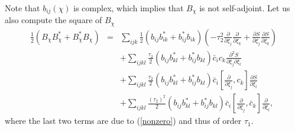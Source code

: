 \documentclass[12pt]{article}
\newcommand{\nn}{\nonumber}
\newcommand{\pa}{\partial}
\begin{document}
Note that $b_{ij}(\chi)$ is complex, which implies that $B_\chi$ is not self-adjoint.
Let us also  compute the square of $B_\chi$  
\begin{eqnarray}
\frac{1}{2}\left( B_\chi B_\chi^*+ B_\chi^* B_\chi \right)&=&  \sum_{ijk}  \frac{1}{2}\left(  b_{ij}  b^*_{ik} +  b^*_{ij}  b_{ik}  \right)  \left(  -\tau_2^2     \frac{\pa}{\pa\xi_{j }}  \frac{\pa}{\pa\xi_{k }}    
+  \frac{\pa S}{\pa \xi_j}\frac{\pa S}{\pa \xi_k}  \right)
\nn\\&&
+ \sum_{ijkl} \frac{\tau_2}{2} \left(  b_{ij} b_{kl}^*+ b_{ij}^* b_{kl} \right) \bar{c}_i   {c}_{k}   \frac{\pa^2 S}{\pa \xi_j\pa \xi_l }      
\nn\\&&
+ \sum_{ijkl} \frac{\tau_2}{2} \left(  b_{ij} b_{kl}^*+ b_{ij}^* b_{kl} \right) \bar{c}_i   \left[\frac{\pa}{\pa \xi_j }  , {c}_{k} \right]  \frac{\pa S}{\pa \xi_l }      
\nn\\&&
+ \sum_{ijkl} \frac{\left(\tau_2\right)^2}{2} \left(  b_{ij} b_{kl}^*+ b_{ij}^* b_{kl} \right) \bar{c}_i  \left[  \frac{\pa}{\pa \xi_j }  , \bar{c}_{k}\right]   \frac{\pa}{\pa \xi_l }  ,
\label{b2}
\end{eqnarray}
where the last two terms are due to (\ref{nonzero}) and thus of order $\tau_1$.
\end{document}
